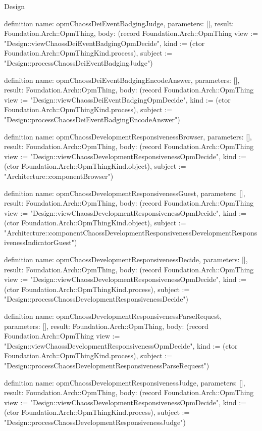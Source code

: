 \begin{lexlean}{Design}
\begin{semanticmodule}
definition{
  name: opmChaossDeiEventBadgingJudge,
  parameters: [],
  result: Foundation.Arch::OpmThing,
  body: (record Foundation.Arch::OpmThing {view := "Design::viewChaossDeiEventBadgingOpmDecide", kind := (ctor Foundation.Arch::OpmThingKind.process), subject := "Design::processChaossDeiEventBadgingJudge"})
}

definition{
  name: opmChaossDeiEventBadgingEncodeAnswer,
  parameters: [],
  result: Foundation.Arch::OpmThing,
  body: (record Foundation.Arch::OpmThing {view := "Design::viewChaossDeiEventBadgingOpmDecide", kind := (ctor Foundation.Arch::OpmThingKind.process), subject := "Design::processChaossDeiEventBadgingEncodeAnswer"})
}

definition{
  name: opmChaossDevelopmentResponsivenessBrowser,
  parameters: [],
  result: Foundation.Arch::OpmThing,
  body: (record Foundation.Arch::OpmThing {view := "Design::viewChaossDevelopmentResponsivenessOpmDecide", kind := (ctor Foundation.Arch::OpmThingKind.object), subject := "Architecture::componentBrowser"})
}

definition{
  name: opmChaossDevelopmentResponsivenessGuest,
  parameters: [],
  result: Foundation.Arch::OpmThing,
  body: (record Foundation.Arch::OpmThing {view := "Design::viewChaossDevelopmentResponsivenessOpmDecide", kind := (ctor Foundation.Arch::OpmThingKind.object), subject := "Architecture::componentChaossDevelopmentResponsivenessDevelopmentResponsivenessIndicatorGuest"})
}

definition{
  name: opmChaossDevelopmentResponsivenessDecide,
  parameters: [],
  result: Foundation.Arch::OpmThing,
  body: (record Foundation.Arch::OpmThing {view := "Design::viewChaossDevelopmentResponsivenessOpmDecide", kind := (ctor Foundation.Arch::OpmThingKind.process), subject := "Design::processChaossDevelopmentResponsivenessDecide"})
}

definition{
  name: opmChaossDevelopmentResponsivenessParseRequest,
  parameters: [],
  result: Foundation.Arch::OpmThing,
  body: (record Foundation.Arch::OpmThing {view := "Design::viewChaossDevelopmentResponsivenessOpmDecide", kind := (ctor Foundation.Arch::OpmThingKind.process), subject := "Design::processChaossDevelopmentResponsivenessParseRequest"})
}

definition{
  name: opmChaossDevelopmentResponsivenessJudge,
  parameters: [],
  result: Foundation.Arch::OpmThing,
  body: (record Foundation.Arch::OpmThing {view := "Design::viewChaossDevelopmentResponsivenessOpmDecide", kind := (ctor Foundation.Arch::OpmThingKind.process), subject := "Design::processChaossDevelopmentResponsivenessJudge"})
}


\end{semanticmodule}
\end{lexlean}
